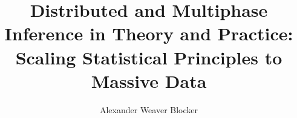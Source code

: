\title{Distributed and Multiphase Inference in Theory and Practice: Scaling Statistical Principles to Massive Data}
\author{Alexander Weaver Blocker}


